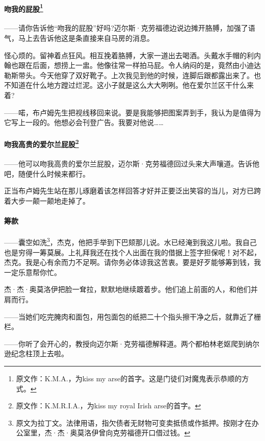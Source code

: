 \paragraph*{吻我的屁股\footnote{原文作：K.M.A.，为kiss my arse的首字。这是门徒们对魔鬼表示恭顺的方式。}}
\par ——请你告诉他“吻我的屁股”好吗?迈尔斯·克劳福德边说边摊开胳膊，加强了语气，马上去告诉他这是条直接来自马房的消息。
\par 怪心烦的。留神着点狂风。相互挽着胳膊，大家一道出去喝酒。头戴水手帽的利内翰也跟在后面，想捞上一盅。他像往常一样拍马屁。令人纳闷的是，竟然由小迪达勒斯带头。今天他穿了双好靴子。上次我见到他的时候，连脚后跟都露出来了。也不知道在什么地方蹚过烂泥。这小子就是这么大大咧咧。他在爱尔兰区干什么来着?
\par ——喏，布卢姆先生把视线移回来说。要是我能够把图案弄到手，我认为是值得为它写上一段的。他想必会刊登广告。我要对他说……
\paragraph*{吻我高贵的爱尔兰屁股\footnote{原文作：K.M.R.I.A.，为kiss my royal Irish arse的首字。}}
\par ——他可以吻我高贵的爱尔兰屁股，迈尔斯·克劳福德回过头来大声嚷道。告诉他吧，随便什么时候来都行。
\par 正当布卢姆先生站在那儿琢磨着该怎样回答才好并正要泛出笑容的当儿，对方已跨着大步一颠一颠地走掉了。
\paragraph*{筹款}
\par ——囊空如洗\footnote{原文为拉丁文。法律用语，指欠债者无财物可变卖抵债或作抵押。按刚才在办公室里，杰·杰·奥莫洛伊曾向克劳福德开口借过钱。}，杰克，他把手举到下巴颏那儿说。水已经淹到我这儿啦。我自己也是穷得一筹莫展。上礼拜我还在找个人出面在我的借据上签字担保呢！对不起，杰克。我是心有余而力不足啊。请你务必体谅我这苦衷。要是好歹能够筹到钱，我一定乐意帮你忙。
\par 杰·杰·奥莫洛伊把脸一耷拉，默默地继续踱着步。他们追上前面的人，和他们并肩而行。
\par ——当她们吃完腌肉和面包，用包面包的纸把二十个指头擦干净之后，就靠近了栅栏。
\par ——你听了会开心的，教授向迈尔斯·克劳福德解释道。两个都柏林老妪爬到纳尔逊纪念柱顶上去啦。
